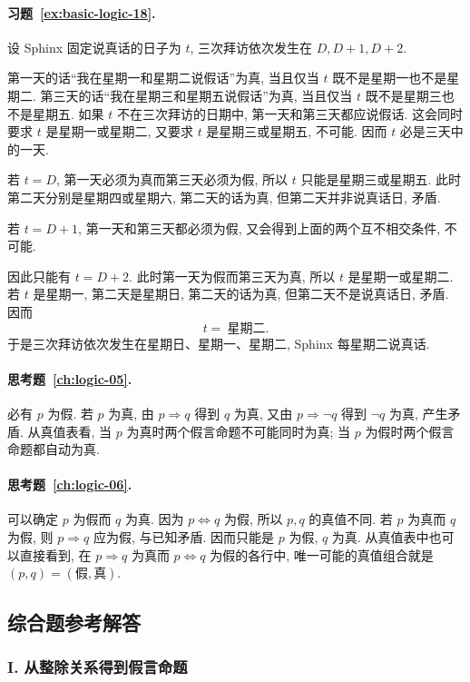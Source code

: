 \documentclass[usesamecnt, thmcnt=section, lang=cn, newtx, 10pt, scheme=chinese]{elegantbook}
\begin{document}
\paragraph*{习题~\ref{ex:basic-logic-18}.}
设 Sphinx 固定说真话的日子为 $t$, 三次拜访依次发生在 $D,D+1,D+2$.

第一天的话``我在星期一和星期二说假话''为真, 当且仅当 $t$ 既不是星期一也不是星期二. 第三天的话``我在星期三和星期五说假话''为真, 当且仅当 $t$ 既不是星期三也不是星期五.
如果 $t$ 不在三次拜访的日期中, 第一天和第三天都应说假话. 这会同时要求 $t$ 是星期一或星期二, 又要求 $t$ 是星期三或星期五, 不可能. 因而 $t$ 必是三天中的一天.

若 $t=D$, 第一天必须为真而第三天必须为假, 所以 $t$ 只能是星期三或星期五. 此时第二天分别是星期四或星期六, 第二天的话为真, 但第二天并非说真话日, 矛盾.

若 $t=D+1$, 第一天和第三天都必须为假, 又会得到上面的两个互不相交条件, 不可能.

因此只能有 $t=D+2$. 此时第一天为假而第三天为真, 所以 $t$ 是星期一或星期二. 若 $t$ 是星期一, 第二天是星期日, 第二天的话为真, 但第二天不是说真话日, 矛盾. 因而
\[
 t=\ \text{星期二}.
\]
于是三次拜访依次发生在星期日、星期一、星期二, Sphinx 每星期二说真话.

\paragraph*{思考题~\ref{ch:logic-05}.}
必有 $p$ 为假. 若 $p$ 为真, 由 $p\Rightarrow q$ 得到 $q$ 为真, 又由 $p\Rightarrow\neg q$ 得到 $\neg q$ 为真, 产生矛盾. 从真值表看, 当 $p$ 为真时两个假言命题不可能同时为真; 当 $p$ 为假时两个假言命题都自动为真.

\paragraph*{思考题~\ref{ch:logic-06}.}
可以确定 $p$ 为假而 $q$ 为真. 因为 $p\Leftrightarrow q$ 为假, 所以 $p,q$ 的真值不同. 若 $p$ 为真而 $q$ 为假, 则 $p\Rightarrow q$ 应为假, 与已知矛盾. 因而只能是 $p$ 为假, $q$ 为真. 从真值表中也可以直接看到, 在 $p\Rightarrow q$ 为真而 $p\Leftrightarrow q$ 为假的各行中, 唯一可能的真值组合就是 $(p,q)=(\text{假},\text{真})$.

\subsection*{综合题参考解答}

\subsubsection*{I. 从整除关系得到假言命题}
\end{document}
